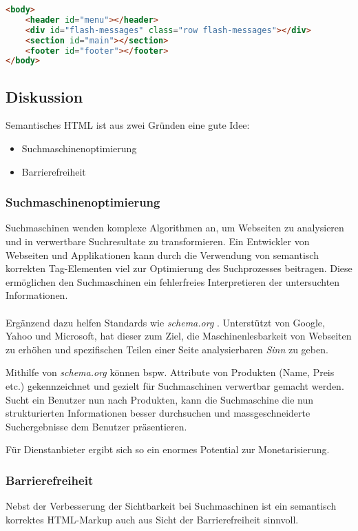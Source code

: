 \begin{lstlisting}[language=HTML, caption=Layout Definition \cite{roomiesHtmlSkeleton}, label=lst:layoutDefinition, firstnumber=27]
<body>
	<header id="menu"></header>
	<div id="flash-messages" class="row flash-messages"></div>
	<section id="main"></section>
	<footer id="footer"></footer>
</body>
\end{lstlisting}

\subsection*{Diskussion}
Semantisches HTML ist aus zwei Gründen eine gute Idee:
\begin{itemize}
	\item Suchmaschinenoptimierung
	\item Barrierefreiheit
\end{itemize}

\subsubsection*{Suchmaschinenoptimierung}
Suchmaschinen wenden komplexe Algorithmen an, um Webseiten zu analysieren und in verwertbare Suchresultate zu transformieren. Ein Entwickler von Webseiten und Applikationen kann durch die Verwendung von semantisch korrekten Tag-Elementen viel zur Optimierung des Suchprozesses beitragen. Diese ermöglichen den Suchmaschinen ein fehlerfreies Interpretieren der untersuchten Informationen.
\\ \\
Ergänzend dazu helfen Standards wie \emph{schema.org} \cite{SchemaOrg}. Unterstützt von Google, Yahoo und Microsoft, hat dieser zum Ziel, die Maschinenlesbarkeit von Webseiten zu erhöhen und spezifischen Teilen einer Seite analysierbaren \emph{Sinn} zu geben.

Mithilfe von \emph{schema.org} können bspw. Attribute von Produkten (Name, Preis etc.) gekennzeichnet und gezielt für Suchmaschinen verwertbar gemacht werden. Sucht ein Benutzer nun nach Produkten, kann die Suchmaschine die nun strukturierten Informationen besser durchsuchen und massgeschneiderte Suchergebnisse dem Benutzer präsentieren.

Für Dienstanbieter ergibt sich so ein enormes Potential zur Monetarisierung.

\subsubsection*{Barrierefreiheit}
Nebst der Verbesserung der Sichtbarkeit bei Suchmaschinen ist ein semantisch korrektes HTML-Markup auch aus Sicht der Barrierefreiheit sinnvoll.


